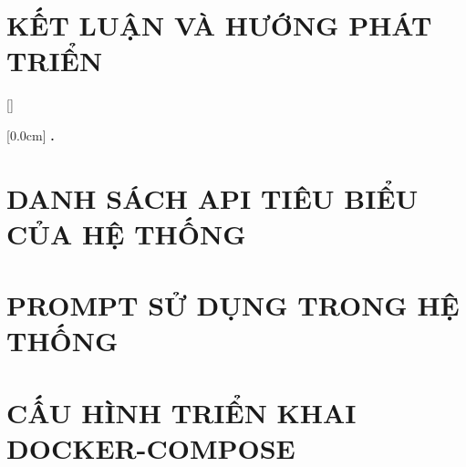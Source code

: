 \documentclass[a4paper,13pt,3p,twoside]{report}
\renewcommand{\bibname}{Danh_sach_tai_lieu_tham_khao}
\theoremstyle{definition}
\begin{document}
\newpage
\chapter{KẾT LUẬN VÀ HƯỚNG PHÁT TRIỂN}
\label{chapter:ket-luan}






\appendixpage
\appendices
\addappheadtotoc


{}[]
\titlespacing*{\chapter}{0pt}{-20pt}{20pt}

    [0.0cm]             %
    {\bfseries\vspace{0.3cm}}                  %
    {{\bfseries{\scshape} \thecontentslabel.\ }} %
    {}         %
    {\contentspage}         %
\chapter{DANH SÁCH API TIÊU BIỂU CỦA HỆ THỐNG}


\newpage
\chapter{PROMPT SỬ DỤNG TRONG HỆ THỐNG}


\newpage
\chapter{CẤU HÌNH TRIỂN KHAI DOCKER-COMPOSE}

\end{document}
